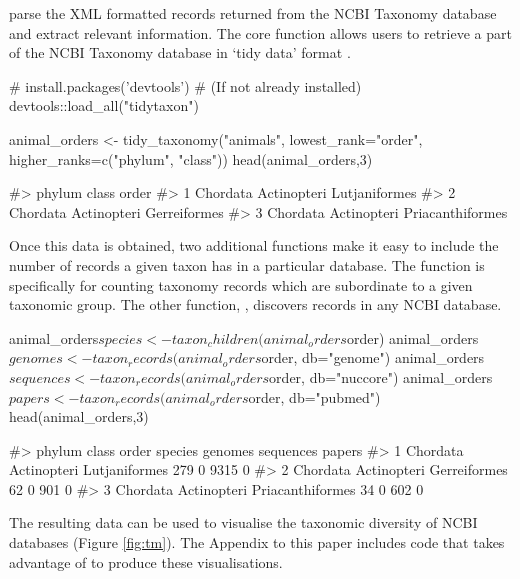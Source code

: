 parse the XML formatted records returned from the NCBI Taxonomy database and
extract relevant information. The core function  allows 
users to retrieve a part of the NCBI  Taxonomy database in `tidy data' format
\citep{tidy-data}.

\begin{example}
# install.packages('devtools') # (If not already installed)
devtools::load_all("tidytaxon")

animal_orders <- tidy_taxonomy("animals", 
                               lowest_rank="order",
                               higher_ranks=c("phylum", "class"))
head(animal_orders,3)

#>     phylum       class            order
#> 1 Chordata Actinopteri    Lutjaniformes
#> 2 Chordata Actinopteri     Gerreiformes
#> 3 Chordata Actinopteri Priacanthiformes
\end{example}

Once this data is obtained, two additional functions make it easy to include the
number of records a given taxon has in a particular database. The function
 is specifically for counting taxonomy records which are
subordinate to a given taxonomic group. The other function,  , 
discovers records in any NCBI database.

\begin{example}
animal_orders$species <- taxon_children(animal_orders$order)
animal_orders$genomes <- taxon_records(animal_orders$order, db="genome")
animal_orders$sequences <- taxon_records(animal_orders$order, db="nuccore")
animal_orders$papers <- taxon_records(animal_orders$order, db="pubmed")
head(animal_orders,3)

#>     phylum       class            order species genomes sequences papers
#> 1 Chordata Actinopteri    Lutjaniformes     279       0      9315      0
#> 2 Chordata Actinopteri     Gerreiformes      62       0       901      0
#> 3 Chordata Actinopteri Priacanthiformes      34       0       602      0
\end{example}

The resulting data can be used to visualise the taxonomic diversity of NCBI 
databases (Figure \ref{fig:tm}). The Appendix to this paper 
includes code that takes advantage of  \citep{treemap} to 
produce these visualisations. 


